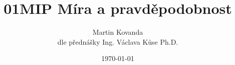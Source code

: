 %


 
\makeindex
 
\title{01MIP Míra a pravděpodobnost}
\date{\today}
\author{Martin Kovanda\\dle přednášky Ing. Václava Kůse Ph.D.}
 


\frontmatter
\maketitle
 
\newpage
{}
\tableofcontents
 



\mainmatter




%
%
%


\backmatter
%
\printindex
 
